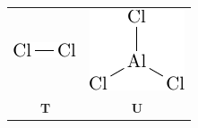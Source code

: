 \documentclass{article}
\begin{document}
	\begin{tabular}{cc}
		\includegraphics{../cl2.pdf} & \includegraphics{../aluminum-chloride.pdf} \\
		\textbf{T} & \textbf{U}
	\end{tabular}
\end{document}
